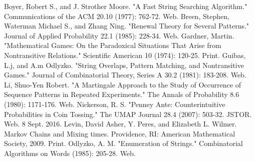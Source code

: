 \documentclass{article}
\numberwithin{mytheorem}{subsection} %
\begin{document}
	\begin{thebibliography}{1}
			Boyer, Robert S., and J. Strother Moore. "A Fast String Searching Algorithm." Communications of the ACM 20.10 (1977): 762-72. Web. 
			Breen, Stephen, Waterman Michael S., and Zhang Ning. "Renewal Theory for Several Patterns." Journal of Applied Probability 22.1 (1985): 228-34. Web.
			Gardner, Martin. "Mathematical Games: On the Paradoxical Situations That Arise from Nontransitive Relations." Scientific American 10 (1974): 120-25. Print.
			Guibas, L.j, and A.m Odlyzko. "String Overlaps, Pattern Matching, and Nontransitive Games." Journal of Combinatorial Theory, Series A 30.2 (1981): 183-208. Web.
			Li, Shuo-Yen Robert. "A Martingale Approach to the Study of Occurrence of Sequence Patterns in Repeated Experiments." The Annals of Probability 8.6 (1980): 1171-176. Web.
			Nickerson, R. S. "Penney Ante: Counterintuitive Probabilities in Coin Tossing." The UMAP Journal 28.4 (2007): 503-32. JSTOR. Web. 8 Sept. 2016. 
			Levin, David Asher, Y. Peres, and Elizabeth L. Wilmer. Markov Chains and Mixing times. Providence, RI: American Mathematical Society, 2009. Print. 
			Odlyzko, A. M. "Enumeration of Strings." Combinatorial Algorithms on Words (1985): 205-28. Web.
			
	\end{thebibliography}
\end{document}
